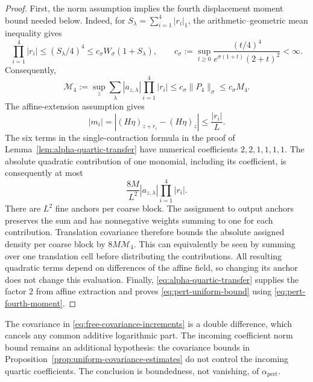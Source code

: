 \documentclass[11pt]{article}
\numberwithin{equation}{section}
\theoremstyle{definition}
\theoremstyle{plain}
\begin{document}
\begin{proof}
First, the norm assumption implies the fourth displacement
moment bound needed below.  Indeed, for
$S_\lambda=\sum_{i=1}^4|r_i|_1$, the arithmetic--geometric
mean inequality gives
\begin{equation}
 \prod_{i=1}^4|r_i|
 \le (S_\lambda/4)^4
 \le c_\sigma W_\sigma(1+S_\lambda),
 \qquad
 c_\sigma:=\sup_{t\ge0}
      \frac{(t/4)^4}{e^{\sigma(1+t)}(2+t)^2}<\infty.
\end{equation}
Consequently,
\begin{equation}
 \mathcal M_4:=\sup_z\sum_\lambda |a_{z,\lambda}|
                          \prod_{i=1}^4|r_i|
 \le c_\sigma\|P_4\|_\sigma
 \le c_\sigma M_4.
 \label{eq:pert-fourth-moment}
\end{equation}
The affine-extension assumption gives
\begin{equation}
 |m_i|=\left|(H\eta)_{z+r_i}-(H\eta)_z\right|
       \le \frac{|r_i|}{L}.
\end{equation}
The six terms in the single-contraction formula in the proof
of Lemma~\ref{lem:alpha-quartic-transfer} have numerical
coefficients $2,2,1,1,1,1$.  The absolute quadratic contribution
of one monomial, including its coefficient, is consequently
at most
\begin{equation}
 \frac{8M}{L^2}|a_{z,\lambda}|
                     \prod_{i=1}^4|r_i|.
\end{equation}
There are $L^2$ fine anchors per coarse block.  The assignment
to output anchors preserves the sum and has nonnegative
weights summing to one for each contribution.  Translation
covariance therefore bounds the absolute assigned density
per coarse block by $8M\mathcal M_4$.  This can equivalently be seen
by summing over one translation cell before distributing
the contributions.  All resulting quadratic terms depend
on differences of the affine field, so changing its anchor
does not change this evaluation.  Finally,
\eqref{eq:alpha-quartic-transfer} supplies the factor $2$
from affine extraction and proves
\eqref{eq:pert-uniform-bound} using \eqref{eq:pert-fourth-moment}.
\end{proof}

The covariance in \eqref{eq:free-covariance-increments} is a
double difference, which cancels any common additive
logarithmic part.  The incoming coefficient norm bound remains
an additional hypothesis: the covariance bounds in
Proposition~\ref{prop:uniform-covariance-estimates} do not
control the incoming quartic coefficients.
The conclusion is boundedness, not vanishing, of
$\alpha_{\mathrm{pert}}$.
\end{document}
